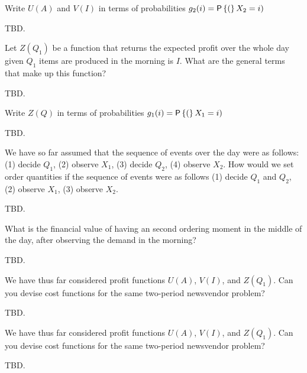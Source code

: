 \begin{question}
Write $U(A)$ and $V(I)$ in terms of probabilities $g_2(i)=\P(X_2=i)$
   \begin{solution}
     TBD.
   \end{solution}
\end{question}

\begin{question}
Let $Z(Q_1)$ be a function that returns the expected profit over the whole day given $Q_1$ items are produced in the morning is $I$. What are the general terms that make up this function?
   \begin{solution}
     TBD.
   \end{solution}
\end{question}

\begin{question}
Write $Z(Q)$ in terms of probabilities $g_1(i)=\P(X_1=i)$
   \begin{solution}
     TBD.
   \end{solution}
\end{question}

\begin{question}
We have so far assumed that the sequence of events over the day were as follows: (1) decide $Q_1$, (2) observe $X_1$, (3) decide $Q_2$, (4) observe $X_2$. How would we set order quantities if the sequence of events were as follows (1) decide $Q_1$ and $Q_2$, (2) observe $X_1$, (3) observe $X_2$.
   \begin{solution}
     TBD.
   \end{solution}
\end{question}

\begin{question}
What is the financial value of having an second ordering moment in the middle of the day, after observing the demand in the morning?
   \begin{solution}
     TBD.
   \end{solution}
\end{question}

\begin{question}
We have thus far considered profit functions $U(A)$, $V(I)$, and $Z(Q_1)$. Can you devise cost functions for the same two-period newsvendor problem?
   \begin{solution}
     TBD.
   \end{solution}
\end{question}

\begin{question}
We have thus far considered profit functions $U(A)$, $V(I)$, and $Z(Q_1)$. Can you devise cost functions for the same two-period newsvendor problem?
   \begin{solution}
     TBD.
   \end{solution}
\end{question}

